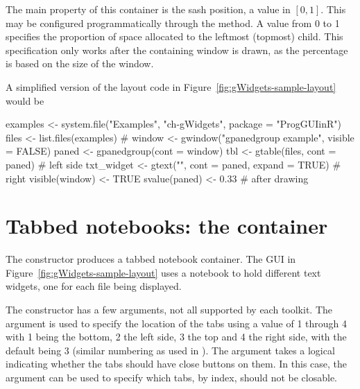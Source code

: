 The main property of this container is the sash position, a value in
$[0,1]$. This may be configured programmatically through the
 method. A value from 0 to 1
specifies the proportion of space allocated to the leftmost (topmost)
child. This specification only works after the containing window is
drawn, as the percentage is based on the size of the window.


A simplified version of the layout code in
Figure~\ref{fig:gWidgets-sample-layout} would be
\begin{Schunk}
\begin{Sinput}
 examples <- system.file("Examples", "ch-gWidgets", 
                  package = "ProgGUIinR")
 files <- list.files(examples)
 #
 window <- gwindow("gpanedgroup example", visible = FALSE)
 paned <- gpanedgroup(cont  =  window)
 tbl <- gtable(files, cont = paned)           # left side
 txt_widget <- gtext("", cont = paned, expand = TRUE) # right
 visible(window) <- TRUE
 svalue(paned) <- 0.33                        # after drawing
\end{Sinput}
\end{Schunk}




  
\section{Tabbed notebooks: the  container}
\label{sec:gWidgets-gnotebook}

The  constructor produces a tabbed notebook
container. The GUI in Figure~\ref{fig:gWidgets-sample-layout} uses a
notebook to hold different text widgets, one for each file being displayed.

The constructor has a few arguments, not all supported by each
toolkit. The argument  is used to specify
the location of the tabs using a value of 1 through 4 with 1 being
the bottom, 2 the left side, 3 the top and 4 the right side, with the
default being 3 (similar numbering as used in ). The
 argument takes a logical indicating
whether the tabs should have close buttons on them. In this case, the
argument  can be used to specify
which tabs, by index, should not be closable.



